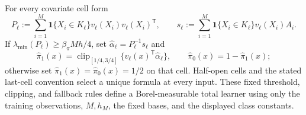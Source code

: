 For every covariate cell form
\[
 P_\ell:=\sum_{i=1}^M\mathbf 1\{X_i\in K_\ell\}v_\ell(X_i)v_\ell(X_i)^{\mathsf T},
 \qquad
 s_\ell:=\sum_{i=1}^M\mathbf 1\{X_i\in K_\ell\}v_\ell(X_i)A_i.
\]
If \(\lambda_{\min}(P_\ell)\ge\beta_\pi Mh/4\), set \(\widehat\alpha_\ell=P_\ell^{-1}s_\ell\) and
\[
 \widehat\pi_1(x)=\operatorname{clip}_{[1/4,3/4]}\{v_\ell(x)^{\mathsf T}\widehat\alpha_\ell\},
 \qquad \widehat\pi_0(x)=1-\widehat\pi_1(x);
\]
otherwise set \(\widehat\pi_1(x)=\widehat\pi_0(x)=1/2\) on that cell.  Half-open cells and the stated last-cell convention select a unique formula at every input.  These fixed threshold, clipping, and fallback rules define a Borel-measurable total learner using only the training observations, \(M,h_M\), the fixed bases, and the displayed class constants.
